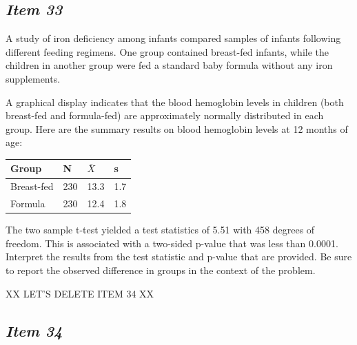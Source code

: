 \subsection{\textbf{\textit{Item 33}}}


A study of iron deficiency among infants compared samples of infants following different feeding regimens. One group contained breast-fed infants, while the children in another group were fed a standard baby formula without any iron supplements. 


A graphical display indicates that the 
blood hemoglobin levels in children (both breast-fed and formula-fed) are approximately normally distributed in each group. 
Here are the summary results on blood hemoglobin levels at 12 months of age:





\begin{table}[!ht]


\begin{center}


\begin{tabular}{llll}


\hline


Group & N & $\bar{X}$ & s\\


\hline


Breast-fed& 230 & 13.3 & 1.7\\


Formula & 230 & 12.4 & 1.8\\


\hline


\end{tabular}


\end{center}


\end{table}


The two sample t-test yielded a test statistics of 5.51 with 458 degrees of freedom. 
This is associated with a two-sided p-value that was less than 0.0001.
Interpret the results from the test statistic and p-value that are provided. 
Be sure to report the observed difference in groups in the context of the problem.

XX LET’S DELETE ITEM 34 XX

\subsection{\textbf{\textit{Item 34}}}



